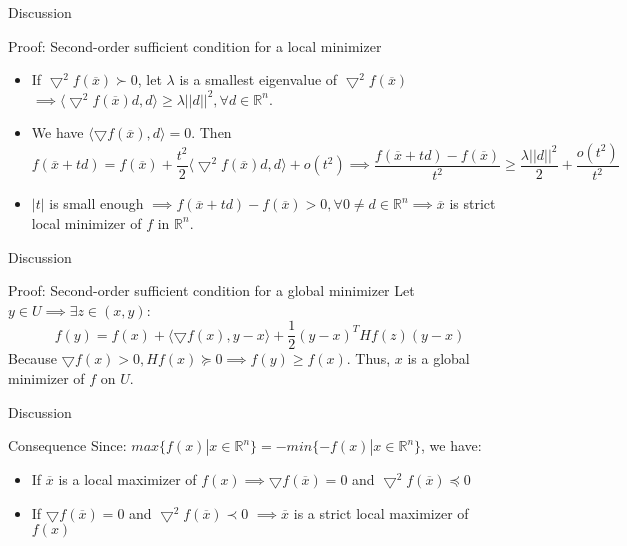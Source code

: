     \begin{frame}{Discussion}
        \begin{block}{Proof: Second-order sufficient condition for a local minimizer}
        \begin{itemize}
            \item If $\bigtriangledown^2 f(\overline{x}) \succ 0$, let $\lambda $ is a smallest eigenvalue of $\bigtriangledown^2 f(\overline{x})$ $\implies \langle \bigtriangledown^2 f(\overline{x})d, d \rangle \geq \lambda ||d||^2, \forall d \in \mathbb{R}^n$.
            \item  We have $\langle \bigtriangledown f(\overline{x}), d \rangle = 0$. Then
                \begin{equation}
                f(\overline{x} + td) =  f(\overline{x}) + \frac{t^2}{2}\langle \bigtriangledown^2 f(\overline{x})d, d \rangle + o(t^2) \implies
                \frac{f(\overline{x} + td) - f(\overline{x})}{t^2} \geq \frac{\lambda ||d||^2}{2} + \frac{o(t^2)}{t^2}
                \end{equation}
            \item $|t|$ is small enough $\implies f(\overline{x} + td) - f(\overline{x}) > 0, \forall 0 \ne d \in \mathbb{R}^n\implies \overline{x}$ is strict local minimizer of $f$ in $\mathbb{R}^n$.
        \end{itemize}
        \end{block}
    \end{frame}

    \begin{frame}{Discussion}
        \begin{block}{Proof: Second-order suﬀicient condition for a global minimizer}
        Let $y \in U \implies \exists z \in (x, y)$:
        \begin{equation}
            f(y) = f(x) +  \langle \bigtriangledown f(x), y - x \rangle + \frac{1}{2}(y-x)^THf(z)(y-x)
        \end{equation}
        Because $\bigtriangledown f(x) > 0, Hf(x) \succeq 0 \implies f(y) \geq f(x)$. Thus, $x$ is a global minimizer of $f$ on $U$.
        \end{block}
    \end{frame}

    
    \begin{frame}{Discussion}
        \begin{block}{Consequence}
             Since: $max \{f(x)| x \in \mathbb{R}^n\} = - min\{-f(x)| x \in \mathbb{R}^n\}$, we have:
            \begin{itemize}
            \item If $\overline{x}$ is a local maximizer of $f(x) \implies \bigtriangledown f(\overline{x}) = 0 $ and $\bigtriangledown^2 f(\overline{x}) \preceq 0$  
            \item If $\bigtriangledown f(\overline{x}) = 0$ and $\bigtriangledown^2 f(\overline{x}) \prec 0$ $\implies \overline{x}$ is a strict local maximizer of $f(x)$
            \end{itemize}
        \end{block}
    \end{frame}

